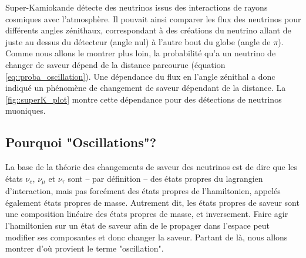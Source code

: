       Super-Kamiokande détecte des neutrinos issus des interactions de rayons cosmiques avec l'atmosphère. Il pouvait ainsi comparer les flux des neutrinos pour différents angles zénithaux, correspondant à des créations du neutrino allant de juste au dessus du détecteur (angle nul) à l'autre bout du globe (angle de $\pi$). Comme nous allons le montrer plus loin, la probabilité qu'a un neutrino de changer de saveur dépend de la distance parcourue (équation \eqref{eq::proba_oscillation}). Une dépendance du flux en l'angle zénithal a donc indiqué un phénomène de changement de saveur dépendant de la distance. La \autoref{fig::superK_plot} montre cette dépendance pour des détections de neutrinos muoniques.

    \subsection{Pourquoi "Oscillations"?}\label{sec::oscillations}
      La base de la théorie des changements de saveur des neutrinos est de dire que les états $\nu_e$, $\nu_{\mu}$ et $\nu_{\tau}$ sont -- par définition -- des états propres du lagrangien d'interaction, mais pas forcément des états propres de l'hamiltonien, appelés également états propres de masse. Autrement dit, les états propres de saveur sont une composition linéaire des états propres de masse, et inversement. Faire agir l'hamiltonien sur un état de saveur afin de le propager dans l'espace peut modifier ses composantes et donc changer la saveur. Partant de là, nous allons montrer d'où provient le terme "oscillation".

